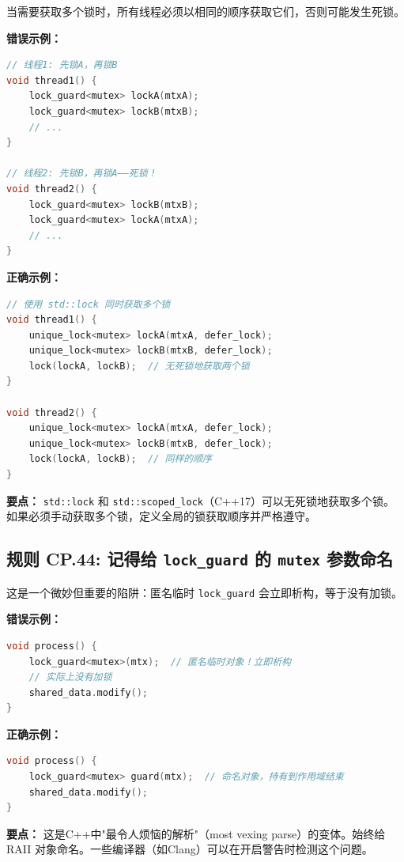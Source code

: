 当需要获取多个锁时，所有线程必须以相同的顺序获取它们，否则可能发生死锁。

\textbf{错误示例：}

\begin{lstlisting}[language=C++]
// 线程1: 先锁A，再锁B
void thread1() {
    lock_guard<mutex> lockA(mtxA);
    lock_guard<mutex> lockB(mtxB);
    // ...
}

// 线程2: 先锁B，再锁A——死锁！
void thread2() {
    lock_guard<mutex> lockB(mtxB);
    lock_guard<mutex> lockA(mtxA);
    // ...
}
\end{lstlisting}

\textbf{正确示例：}

\begin{lstlisting}[language=C++]
// 使用 std::lock 同时获取多个锁
void thread1() {
    unique_lock<mutex> lockA(mtxA, defer_lock);
    unique_lock<mutex> lockB(mtxB, defer_lock);
    lock(lockA, lockB);  // 无死锁地获取两个锁
}

void thread2() {
    unique_lock<mutex> lockA(mtxA, defer_lock);
    unique_lock<mutex> lockB(mtxB, defer_lock);
    lock(lockA, lockB);  // 同样的顺序
}
\end{lstlisting}

\textbf{要点：} \texttt{std::lock} 和 \texttt{std::scoped\_lock}（C++17）可以无死锁地获取多个锁。如果必须手动获取多个锁，定义全局的锁获取顺序并严格遵守。

\subsection*{\textbf{规则 CP.44:} 记得给 \texttt{lock\_guard} 的 \texttt{mutex} 参数命名}

这是一个微妙但重要的陷阱：匿名临时 \texttt{lock\_guard} 会立即析构，等于没有加锁。

\textbf{错误示例：}

\begin{lstlisting}[language=C++]
void process() {
    lock_guard<mutex>(mtx);  // 匿名临时对象！立即析构
    // 实际上没有加锁
    shared_data.modify();
}
\end{lstlisting}

\textbf{正确示例：}

\begin{lstlisting}[language=C++]
void process() {
    lock_guard<mutex> guard(mtx);  // 命名对象，持有到作用域结束
    shared_data.modify();
}
\end{lstlisting}

\textbf{要点：} 这是C++中"最令人烦恼的解析"（most vexing parse）的变体。始终给 RAII 对象命名。一些编译器（如Clang）可以在开启警告时检测这个问题。


